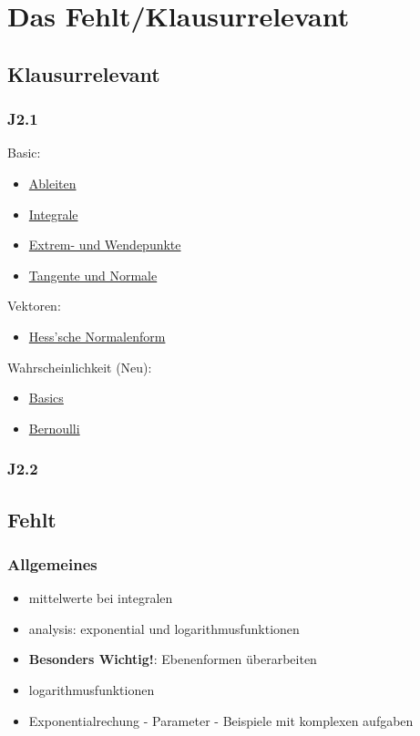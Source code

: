 \chapter{Das Fehlt/Klausurrelevant}

\section{Klausurrelevant}
\subsection{J2.1}
Basic:
\begin{multicols}{2}
    \begin{itemize}
        \item \hyperref[sec:ableiten]{Ableiten}
        \item \hyperref[sec:integrale]{Integrale} 
        \item \hyperref[sec:extremundwendepunkte]{Extrem- und Wendepunkte}
        \item \hyperref[sec:tangenteundnormale]{Tangente und Normale}
    \end{itemize}
\end{multicols}

Vektoren:
\begin{itemize}
    \item \hyperref[sec:hessscheform]{Hess'sche Normalenform}
\end{itemize}

Wahrscheinlichkeit (Neu):
\begin{itemize}
    \item \hyperref[sec:elemkombinatorik]{Basics}
    \item \hyperref[sec:bernoulli]{Bernoulli}
\end{itemize}

\subsection{J2.2}


\section{Fehlt}
\subsection{Allgemeines}
\begin{itemize}
    \item mittelwerte bei integralen
    \item analysis: exponential und logarithmusfunktionen
    \item \textbf{Besonders Wichtig!}: Ebenenformen überarbeiten 
    \item logarithmusfunktionen
    \item Exponentialrechung - Parameter - Beispiele mit komplexen aufgaben
\end{itemize}

